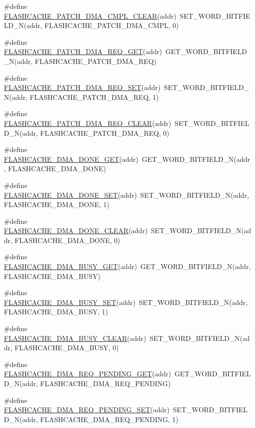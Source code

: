 \begin{DoxyCompactItemize}
\item 
\#define \hyperlink{a00549_aa106060ecd62e58b84d208cf2653ba8e}{FLASHCACHE\_\-PATCH\_\-DMA\_\-CMPL\_\-CLEAR}(addr)~SET\_\-WORD\_\-BITFIELD\_\-N(addr, FLASHCACHE\_\-PATCH\_\-DMA\_\-CMPL, 0)
\item 
\#define \hyperlink{a00549_a1c759415c742e68c2b9615a7d818995e}{FLASHCACHE\_\-PATCH\_\-DMA\_\-REQ\_\-GET}(addr)~GET\_\-WORD\_\-BITFIELD\_\-N(addr, FLASHCACHE\_\-PATCH\_\-DMA\_\-REQ)
\item 
\#define \hyperlink{a00549_abc67bc3bd8e24069f9b9d0f1bb700152}{FLASHCACHE\_\-PATCH\_\-DMA\_\-REQ\_\-SET}(addr)~SET\_\-WORD\_\-BITFIELD\_\-N(addr, FLASHCACHE\_\-PATCH\_\-DMA\_\-REQ, 1)
\item 
\#define \hyperlink{a00549_ad37b03a4cd313694aa994b884221731c}{FLASHCACHE\_\-PATCH\_\-DMA\_\-REQ\_\-CLEAR}(addr)~SET\_\-WORD\_\-BITFIELD\_\-N(addr, FLASHCACHE\_\-PATCH\_\-DMA\_\-REQ, 0)
\item 
\#define \hyperlink{a00549_af4e06cd153745467886246d4ffa1c0aa}{FLASHCACHE\_\-DMA\_\-DONE\_\-GET}(addr)~GET\_\-WORD\_\-BITFIELD\_\-N(addr, FLASHCACHE\_\-DMA\_\-DONE)
\item 
\#define \hyperlink{a00549_a8f58277d982f0b2799e10b69eea87772}{FLASHCACHE\_\-DMA\_\-DONE\_\-SET}(addr)~SET\_\-WORD\_\-BITFIELD\_\-N(addr, FLASHCACHE\_\-DMA\_\-DONE, 1)
\item 
\#define \hyperlink{a00549_a70d98f850d44061a492586f3ea80078d}{FLASHCACHE\_\-DMA\_\-DONE\_\-CLEAR}(addr)~SET\_\-WORD\_\-BITFIELD\_\-N(addr, FLASHCACHE\_\-DMA\_\-DONE, 0)
\item 
\#define \hyperlink{a00549_a679cc402ea18584a894f95e0d1800b1a}{FLASHCACHE\_\-DMA\_\-BUSY\_\-GET}(addr)~GET\_\-WORD\_\-BITFIELD\_\-N(addr, FLASHCACHE\_\-DMA\_\-BUSY)
\item 
\#define \hyperlink{a00549_a6b7fd0abb8bbabe102d1894d29a7b5d5}{FLASHCACHE\_\-DMA\_\-BUSY\_\-SET}(addr)~SET\_\-WORD\_\-BITFIELD\_\-N(addr, FLASHCACHE\_\-DMA\_\-BUSY, 1)
\item 
\#define \hyperlink{a00549_a5f6a8161be175ec6b5489113725d5c4d}{FLASHCACHE\_\-DMA\_\-BUSY\_\-CLEAR}(addr)~SET\_\-WORD\_\-BITFIELD\_\-N(addr, FLASHCACHE\_\-DMA\_\-BUSY, 0)
\item 
\#define \hyperlink{a00549_aa08679ed2bf7212981d9acbe5dfe160d}{FLASHCACHE\_\-DMA\_\-REQ\_\-PENDING\_\-GET}(addr)~GET\_\-WORD\_\-BITFIELD\_\-N(addr, FLASHCACHE\_\-DMA\_\-REQ\_\-PENDING)
\item 
\#define \hyperlink{a00549_a46eb0c0377d9c90b083e6ad6e55c8948}{FLASHCACHE\_\-DMA\_\-REQ\_\-PENDING\_\-SET}(addr)~SET\_\-WORD\_\-BITFIELD\_\-N(addr, FLASHCACHE\_\-DMA\_\-REQ\_\-PENDING, 1)

\end{DoxyCompactItemize}
